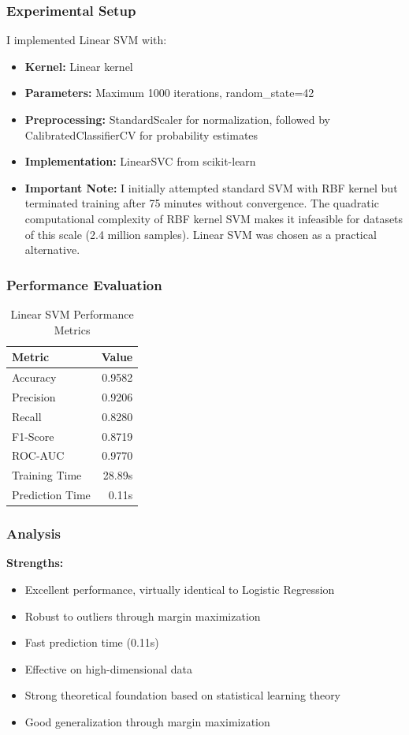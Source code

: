 \documentclass[sigconf]{acmart}
\begin{document}
\subsubsection{Experimental Setup}
I implemented Linear SVM with:
\begin{itemize}
    \item \textbf{Kernel:} Linear kernel
    \item \textbf{Parameters:} Maximum 1000 iterations, random\_state=42
    \item \textbf{Preprocessing:} StandardScaler for normalization, followed by CalibratedClassifierCV for probability estimates
    \item \textbf{Implementation:} LinearSVC from scikit-learn
    \item \textbf{Important Note:} I initially attempted standard SVM with RBF kernel but terminated training after 75 minutes without convergence. The quadratic computational complexity of RBF kernel SVM makes it infeasible for datasets of this scale (2.4 million samples). Linear SVM was chosen as a practical alternative.
\end{itemize}

\subsubsection{Performance Evaluation}
\begin{table}[h]
\centering
\caption{Linear SVM Performance Metrics}
\begin{tabular}{lr}
\toprule
Metric & Value \\
\midrule
Accuracy & 0.9582 \\
Precision & 0.9206 \\
Recall & 0.8280 \\
F1-Score & 0.8719 \\
ROC-AUC & 0.9770 \\
Training Time & 28.89s \\
Prediction Time & 0.11s \\
\bottomrule
\end{tabular}
\end{table}

\subsubsection{Analysis}
\textbf{Strengths:}
\begin{itemize}
    \item Excellent performance, virtually identical to Logistic Regression
    \item Robust to outliers through margin maximization
    \item Fast prediction time (0.11s)
    \item Effective on high-dimensional data
    \item Strong theoretical foundation based on statistical learning theory
    \item Good generalization through margin maximization
\end{itemize}
\end{document}
